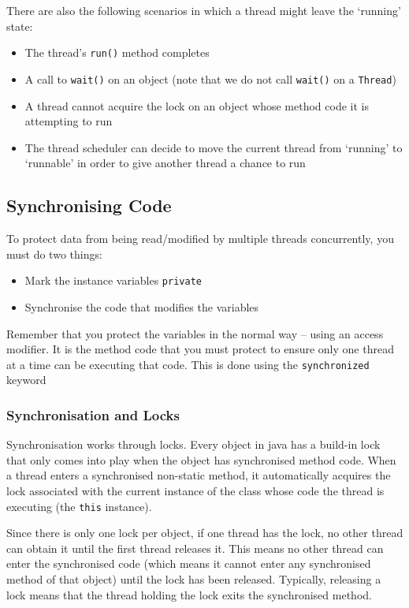 There are also the following scenarios in which a thread might leave the 
`running' state:
\begin{itemize}
    \item The thread's \verb#run()# method completes
    \item A call to \verb#wait()# on an object (note that we do not call 
    \verb#wait()# on a \verb#Thread#)
    \item A thread cannot acquire the lock on an object whose method code it is 
    attempting to run
    \item The thread scheduler can decide to move the current thread from 
    `running' to `runnable' in order to give another thread a chance to run
\end{itemize}

\subsection{Synchronising Code}
To protect data from being read/modified by multiple threads concurrently, you 
must do two things:
\begin{itemize}
    \item Mark the instance variables \verb#private#
    \item Synchronise the code that modifies the variables
\end{itemize}
Remember that you protect the variables in the normal way -- using an access 
modifier. It is the method code that you must protect to ensure only one thread 
at a time can be executing that code. This is done using the 
\verb#synchronized# keyword

\subsubsection{Synchronisation and Locks}
Synchronisation works through locks. Every object in java has a build-in lock 
that only comes into play when the object has synchronised method code. When a 
thread enters a synchronised non-static method, it automatically acquires the 
lock associated with the current instance of the class whose code the thread is 
executing (the \verb#this# instance).

Since there is only one lock per object, if one thread has the lock, no other 
thread can obtain it until the first thread releases it. This means no other 
thread can enter the synchronised code (which means it cannot enter any 
synchronised method of that object) until the lock has been released.  
Typically, releasing a lock means that the thread holding the lock exits the 
synchronised method.

